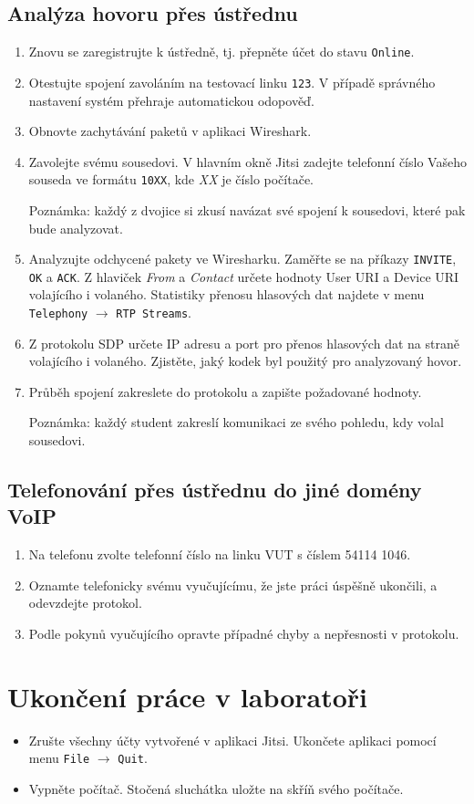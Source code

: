 \documentclass[a4paper,11pt]{article}
\begin{document}
\subsection{Analýza hovoru přes ústřednu}
\begin{enumerate}
  \item Znovu se zaregistrujte k ústředně, tj. přepněte účet do stavu {\tt Online}.
  \item Otestujte spojení zavoláním na testovací linku {\tt 123}. V případě správného nastavení systém přehraje automatickou odopověď. 
    \item Obnovte zachytávání paketů v aplikaci Wireshark.
    \item Zavolejte svému sousedovi. V hlavním okně Jitsi zadejte telefonní číslo Vašeho souseda ve formátu {\tt 10XX}, kde {\it XX} je číslo počítače.

    {\small Poznámka: každý z dvojice si zkusí navázat své spojení k sousedovi, které pak bude analyzovat.}
    \item Analyzujte odchycené pakety ve Wiresharku. Zaměřte se na příkazy {\tt INVITE}, {\tt OK} a {\tt ACK}. Z hlaviček {\it From} a {\it Contact} určete hodnoty User URI a Device URI volajícího i volaného. Statistiky přenosu hlasových dat najdete v menu {\tt Telephony} $\rightarrow$ {\tt RTP Streams}. 
    \item Z protokolu SDP určete IP adresu a port pro přenos hlasových dat na straně volajícího i volaného. Zjistěte, jaký kodek byl použitý pro analyzovaný hovor. 
    \item Průběh spojení zakreslete do protokolu a zapište požadované hodnoty.

      {\small Poznámka: každý student zakreslí komunikaci ze svého pohledu, kdy volal sousedovi.}
\end{enumerate}

\subsection{Telefonování přes ústřednu do jiné domény VoIP}
\begin{enumerate}
    \item Na telefonu zvolte telefonní číslo na linku VUT s číslem 54114 1046.
    \item Oznamte telefonicky svému vyučujícímu, že jste práci úspěšně ukončili, a odevzdejte protokol. 
    \item Podle pokynů vyučujícího opravte případné chyby a nepřesnosti v protokolu. 
\end{enumerate}

\section{Ukončení práce v laboratoři}
\begin{itemize}
  \item Zrušte všechny účty vytvořené v aplikaci Jitsi. Ukončete aplikaci pomocí menu {\tt File} $\rightarrow$ {\tt Quit}.
  \item Vypněte počítač. Stočená sluchátka uložte na skříň svého počítače.
\end{itemize}
\end{document}
